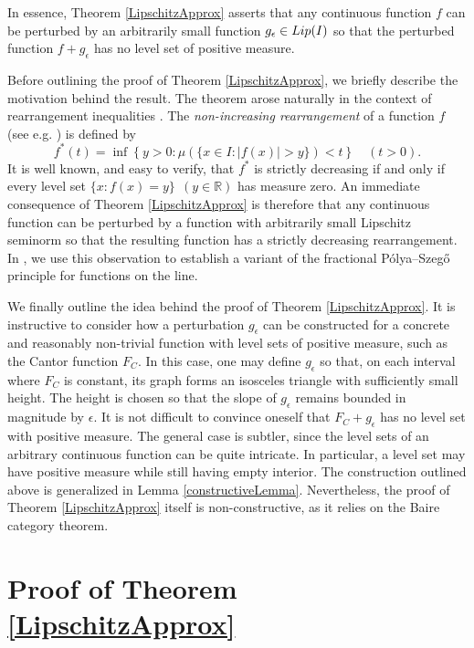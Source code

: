 \documentclass[10pt,a4paper]{amsart}
\numberwithin{equation}{section}
\begin{document}
In essence, Theorem \ref{LipschitzApprox} asserts that any continuous function $f$ can be perturbed by an arbitrarily small function $g_\epsilon\in{\rm Lip}(I)$ so that the perturbed function $f+g_\epsilon$ has no level set of positive measure.  


Before outlining the proof of Theorem \ref{LipschitzApprox}, we briefly describe the motivation behind the result. The theorem arose naturally in the context of rearrangement inequalities \cite{BaLi26a}. The \emph{non-increasing rearrangement} of a function $f$ (see e.g. \cite[Chapter 2]{BeSh88}) is defined by
\begin{equation}
    \nonumber
    f^*(t)=\inf\left\{y>0:\mu(\{x\in I:|f(x)|>y\})<t\right\}\quad(t>0).
\end{equation}
It is well known, and easy to verify, that
$f^*$ is strictly decreasing if and only if every level set $\{x:f(x)=y\}~~(y\in\mathbb{R})$ has measure zero. An immediate consequence of Theorem \ref{LipschitzApprox} is therefore that any continuous function can be perturbed by a function with arbitrarily small Lipschitz seminorm so that the resulting function has a strictly decreasing rearrangement. In \cite{BaLi26a}, we use this observation to establish a variant of the fractional P\'{o}lya--Szeg\H{o} principle for functions on the line.

We finally outline the idea behind the proof of Theorem \ref{LipschitzApprox}. It is instructive to consider how a perturbation $g_\epsilon$ can be constructed for a concrete and reasonably non-trivial function with level sets of positive measure, such as the Cantor function $F_C$. In this case, one may define $g_\epsilon$ so that, on each interval where $F_C$ is constant, its graph forms an isosceles triangle with sufficiently small height. The height is chosen so that the slope of $g_\epsilon$ remains bounded in magnitude by $\epsilon$.
It is not difficult to convince oneself that $F_C+g_\epsilon$ has no level set with positive measure. The general case is subtler, since the level sets of an arbitrary continuous function can be quite intricate. In particular, a level set may have positive measure while still having empty interior. The construction outlined above is generalized in Lemma \ref{constructiveLemma}.  Nevertheless, the proof of Theorem \ref{LipschitzApprox} itself is non-constructive, as it relies on the Baire category theorem.



\section{Proof of Theorem \ref{LipschitzApprox}}
\end{document}
